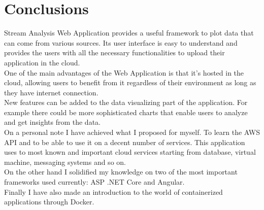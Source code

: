\chapter{Conclusions}
\label{chap:06}

Stream Analysis Web Application provides a useful framework to plot data that can come from various sources. Its user interface is easy to understand and provides the users with all the necessary functionalities to upload their application in the cloud.\\

One of the main advantages of the Web Application is that it's hosted in the cloud, allowing users to benefit from it regardless of their environment as long as they have internet connection.\\

New features can be added to the data visualizing part of the application. For example there could be more sophisticated charts that enable users to analyze and get insights from the data.\\

On a personal note I have achieved what I proposed for myself. To learn the AWS API and to be able to use it on a decent number of services. This application uses to most known and important cloud services starting from database, virtual machine, messaging systems and so on.\\

On the other hand I solidified my knowledge on two of the most important frameworks used currently: ASP .NET Core and Angular.\\

Finally I have also made an introduction to the world of containerized applications through Docker.